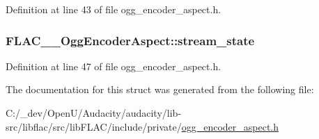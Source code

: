 Definition at line 43 of file ogg\+\_\+encoder\+\_\+aspect.\+h.

\subsubsection[{\texorpdfstring{stream\+\_\+state}{stream_state}}]{ F\+L\+A\+C\+\_\+\+\_\+\+Ogg\+Encoder\+Aspect\+::stream\+\_\+state}\hypertarget{struct_f_l_a_c_____ogg_encoder_aspect_af973367ff9fcf024230035659520d199}{}\label{struct_f_l_a_c_____ogg_encoder_aspect_af973367ff9fcf024230035659520d199}


Definition at line 47 of file ogg\+\_\+encoder\+\_\+aspect.\+h.



The documentation for this struct was generated from the following file\+:\begin{DoxyCompactItemize}
\item 
C\+:/\+\_\+dev/\+Open\+U/\+Audacity/audacity/lib-\/src/libflac/src/lib\+F\+L\+A\+C/include/private/\hyperlink{ogg__encoder__aspect_8h}{ogg\+\_\+encoder\+\_\+aspect.\+h}\end{DoxyCompactItemize}
